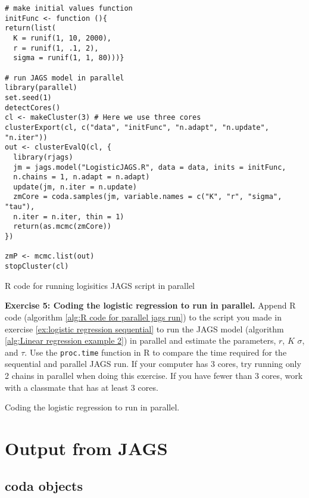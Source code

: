 \documentclass[12pt,english]{article}
\begin{document}
\begin{algorithm}
\begin{Verbatim}[frame=single]
# make initial values function
initFunc <- function (){
return(list(
  K = runif(1, 10, 2000),
  r = runif(1, .1, 2),
  sigma = runif(1, 1, 80)))}

# run JAGS model in parallel
library(parallel)
set.seed(1)
detectCores()
cl <- makeCluster(3) # Here we use three cores
clusterExport(cl, c("data", "initFunc", "n.adapt", "n.update", "n.iter")) 
out <- clusterEvalQ(cl, {
  library(rjags)
  jm = jags.model("LogisticJAGS.R", data = data, inits = initFunc, 
  n.chains = 1, n.adapt = n.adapt)
  update(jm, n.iter = n.update)
  zmCore = coda.samples(jm, variable.names = c("K", "r", "sigma", "tau"), 
  n.iter = n.iter, thin = 1)
  return(as.mcmc(zmCore))
}) 

zmP <- mcmc.list(out)
stopCluster(cl)
\end{Verbatim}
\caption{R code for running logisitics JAGS script in parallel}
\label{alg:R code for parallel jags run}
\end{algorithm}

\belowcaptionskip=-40pt
\begin{exercise}
\begin{mdframed}
\doublespacing
\textbf{Exercise 5: Coding the logistic regression to run in parallel.}  Append R code (algorithm \ref{alg:R code for parallel jags run}) to the script you made in exercise \ref{ex:logistic regression sequential} to run the JAGS model (algorithm \ref{alg:Linear regression example 2}) in parallel and estimate the parameters, $r$, $K$ $\sigma$, and $\tau$. Use the \texttt{proc.time} function in R to compare the time required for the sequential and parallel JAGS run. If your computer has 3 cores, try running only 2 chains in parallel when doing this exercise. If you have fewer than 3 cores, work with a classmate that has at least 3 cores.
\end{mdframed}
\captionsetup{textformat=empty, labelformat=empty}
\caption[Coding the logistic regression to run in parallel]{Coding the logistic regression to run in parallel.}
\label{ex:logistic regression parallel}
\end{exercise}
\belowcaptionskip=0pt

\section{Output from JAGS}

\subsection{coda objects}
\end{document}
